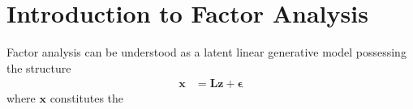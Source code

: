 \documentclass[12pt]{article}
\begin{document}
\section{Introduction to Factor Analysis}
Factor analysis can be understood as a latent linear generative model possessing the structure
\begin{align}
	\mathbf{x} &= \mathbf{L} \mathbf{z} + \boldsymbol{\epsilon}
\end{align}
where $\mathbf{x}$ constitutes the 
\end{document}
